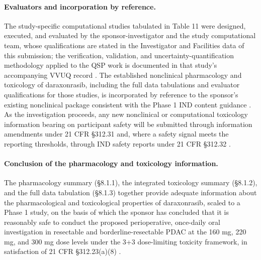 \paragraph{Evaluators and incorporation by reference.}
The study-specific computational studies tabulated in Table 11 were designed,
executed, and evaluated by the sponsor-investigator and the study computational
team, whose qualifications are stated in the Investigator and Facilities data of
this submission; the verification, validation, and uncertainty-quantification
methodology applied to the QSP work is documented in that study's accompanying
VVUQ record \cite{qspmetpancre}. The established nonclinical pharmacology and
toxicology of daraxonrasib, including the full data tabulations and evaluator
qualifications for those studies, is incorporated by reference to the sponsor's
existing nonclinical package consistent with the Phase 1 IND content guidance
\cite{phase1guidance,daraxwhipple}. As the investigation proceeds, any new
nonclinical or computational toxicology information bearing on participant safety
will be submitted through information amendments under 21 CFR \S 312.31 and, where
a safety signal meets the reporting thresholds, through IND safety reports under
21 CFR \S 312.32 \cite{cfr312paiuni}.

\paragraph{Conclusion of the pharmacology and toxicology information.}
The pharmacology summary (\S 8.1.1), the integrated toxicology summary
(\S 8.1.2), and the full data tabulation (\S 8.1.3) together provide adequate
information about the pharmacological and toxicological properties of
daraxonrasib, scaled to a Phase 1 study, on the basis of which the sponsor has
concluded that it is reasonably safe to conduct the proposed perioperative,
once-daily oral investigation in resectable and borderline-resectable PDAC at the
160 mg, 220 mg, and 300 mg dose levels under the 3+3 dose-limiting toxicity
framework, in satisfaction of 21 CFR \S 312.23(a)(8)
\cite{phase1guidance,cfr312paiuni,daraxwhipple}.
